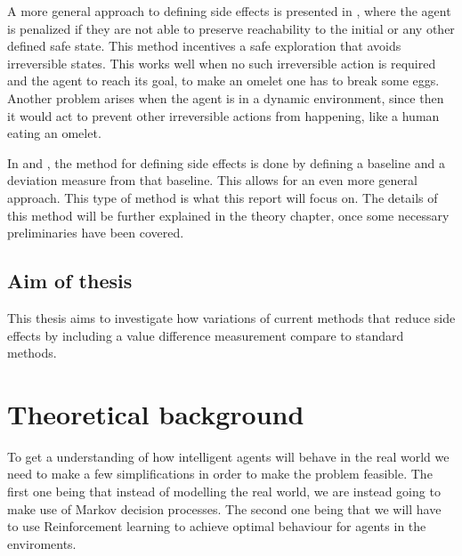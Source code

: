 \documentclass[12pt,A4]{report}
\theoremstyle{definition}
\begin{document}
A more general approach to defining side effects is presented in \autocite{Eysenbach et al}, where the agent is penalized if they are not able to preserve reachability to the initial or any other defined safe state. This method incentives a safe exploration that avoids irreversible states. This works well when no such irreversible action is required and the agent to reach its goal, to make an omelet one has to break some eggs. Another problem arises when the agent is in a dynamic environment, since then it would act to prevent other irreversible actions from happening, like a human eating an omelet. 

In \autocite{Krakovn et al 2019} and \autocite{Turner et al 2020}, the method for defining side effects is done by defining a baseline and a deviation measure from that baseline. This allows for an even more general approach. This type of method is what this report will focus on. The details of this method will be further explained in the theory chapter, once some necessary preliminaries have been covered.

\section{Aim of thesis}
This thesis aims to investigate how variations of current methods that reduce side effects by including a value difference measurement compare to standard methods. 


 


\chapter{Theoretical background}
To get a understanding of how intelligent agents will behave in the real world we need to make a few simplifications in order to make the problem feasible. The first one being that instead of modelling the real world, we are instead going to make use of Markov decision processes. The second one being that we will have to use Reinforcement learning to achieve optimal behaviour for agents in the enviroments. 
\end{document}
